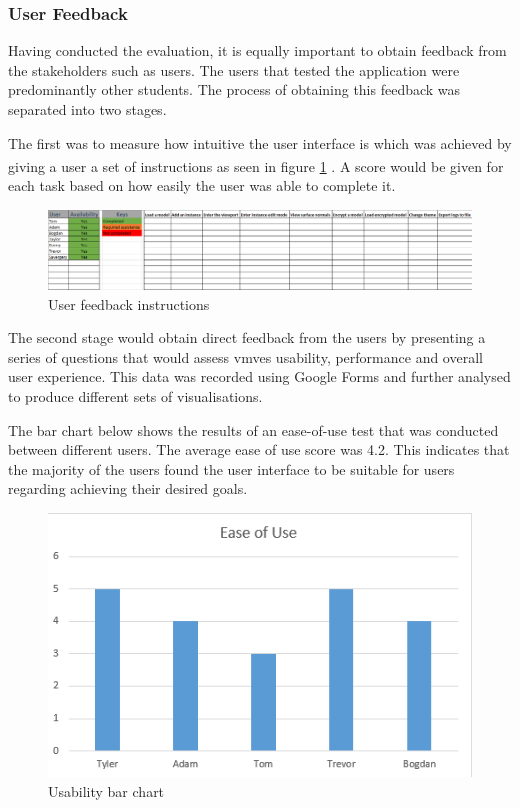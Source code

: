 \documentclass[11pt]{article}
\begin{document}
\subsubsection{User Feedback}
Having conducted the evaluation, it is equally important to obtain feedback from
the stakeholders such as users. The users that tested the application were
predominantly other students. The process of obtaining this feedback was
separated into two stages.

The first was to measure how intuitive the user interface is which was achieved
by giving a user a set of instructions as seen in figure \ref{fig:instructions}
\textsuperscript{}.
A score would be given for each task based on how easily the user was able to
complete it.

\begin{figure}[H]
  \centering
  \includegraphics[width=\textwidth]{images/user_instructions.png}
  \caption{User feedback instructions }
  \label{fig:instructions}
\end{figure}

The second stage would obtain direct feedback from the users by presenting a
series of questions that would assess \glspl*{vmve} usability, performance and
overall user experience. This data was recorded using Google Forms and further
analysed to produce different sets of visualisations.

The bar chart below shows the results of an ease-of-use test that was conducted
between different users. The average ease of use score was 4.2. This indicates
that the majority of the users found the user interface to be suitable for users
regarding achieving their desired goals.

\begin{figure}[H]
  \centering
  \includegraphics[width=\textwidth]{images/bar_chart_usability.png}
  \caption{Usability bar chart}
  \label{fig:bar_chart_usability}
\end{figure}
\end{document}
